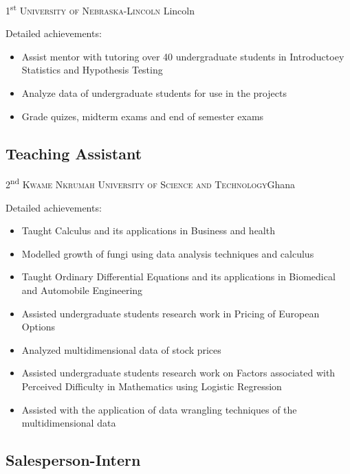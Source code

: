 \documentclass[11pt,a4paper,sans]{moderncv} %
\begin{document}
{1\textsuperscript{st}}
{\textsc{University of Nebraska-Lincoln}}
{Lincoln}
{}{
Detailed achievements:
\begin{itemize}
\item Assist mentor with tutoring over 40 undergraduate students in Introductoey Statistics and Hypothesis Testing
\item Analyze data of undergraduate students for use in the projects
\item Grade quizes, midterm exams and end of semester exams
\end{itemize}}


\subsection{Teaching Assistant}

{2\textsuperscript{nd}}
{\textsc{Kwame Nkrumah University of Science and Technology}}{Ghana}
{}{
Detailed achievements:
\begin{itemize}
\item 	Taught Calculus and its applications in Business and health
\item 	Modelled growth of fungi using data analysis techniques and calculus
\item Taught Ordinary Differential Equations and its applications in Biomedical and Automobile Engineering
\item Assisted undergraduate students research work in Pricing of European Options
\item 	Analyzed multidimensional data of stock prices
\item 	Assisted undergraduate students research work on Factors associated with Perceived Difficulty in Mathematics using Logistic Regression
\item 	Assisted with the application of data wrangling techniques of the multidimensional data
\end{itemize}}



\subsection{Salesperson-Intern}
\end{document}
